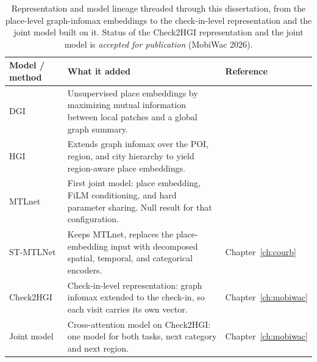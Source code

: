 \begin{table}[htbp]
  \centering
  \caption{Representation and model lineage threaded through this dissertation, from the
  place-level graph-infomax embeddings to the check-in-level representation and the joint
  model built on it. Status of the Check2HGI representation and the joint model is
  \emph{accepted for publication} (MobiWac 2026).}
  \label{tab:fund:lineage}
  \begin{tabularx}{\textwidth}{@{}l>{\raggedright\arraybackslash}Xl@{}}
    \toprule
    Model / method & What it added & Reference \\
    \midrule
    DGI & Unsupervised place embeddings by maximizing mutual information between local patches and a global graph summary. & \cite{velickovic2019deep} \\
    \addlinespace
    HGI & Extends graph infomax over the POI, region, and city hierarchy to yield region-aware place embeddings. & \cite{huang2023hgi} \\
    \addlinespace
    MTLnet & First joint model: place embedding, FiLM conditioning, and hard parameter sharing. Null result for that configuration. & \cite{silva2025mtlnet} \\
    \addlinespace
    ST-MTLNet & Keeps MTLnet, replaces the place-embedding input with decomposed spatial, temporal, and categorical encoders. & Chapter~\ref{ch:courb} \\
    \addlinespace
    Check2HGI & Check-in-level representation: graph infomax extended to the check-in, so each visit carries its own vector. & Chapter~\ref{ch:mobiwac} \\
    \addlinespace
    Joint model & Cross-attention model on Check2HGI: one model for both tasks, next category and next region. & Chapter~\ref{ch:mobiwac} \\
    \bottomrule
  \end{tabularx}
\end{table}
